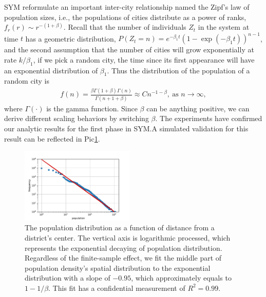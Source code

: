 \documentclass[reprint,unsortedaddress,amsmath,amssymb,aps,prl,fixfloat,showkeys]{revtex4-2}
\begin{document}
SYM reformulate an important inter-city relationship named the Zipf's law of population sizes\cite{gabaix1999zipf's}, i.e., the populations of cities distribute as a power of ranks, $f_r(r)\sim r^{-(1+\beta)}$. Recall that the number of individuals $Z_t$ in the system at time $t$ has a geometric distribution\cite{durrett1999essentials}, $P(Z_t=n)=e^{-\beta_1t}(1-\exp(- {\beta_1} t))^{n-1}$, and the second assumption that the number of cities will grow exponentially at rate $k/\beta_1$, if we pick a random city, the time since its first appearance will have an exponential distribution of $\beta_1$. Thus the distribution of the population of a random city is 
\begin{align}
	f(n)=\frac{\beta\Gamma(1+\beta)\Gamma(n)}{\Gamma(n+1+\beta)}\approx Cn^{-1-\beta}, \ \text{as } n\rightarrow\infty,
\end{align}
where $\Gamma(\cdot)$ is the gamma function. Since $\beta$ can be anything positive, we can derive different scaling behaviors by switching $\beta$. The experiments have confirmed our analytic results for the first phase in SYM.\@ A simulated validation for this result can be reflected in Pic\@\ref{fig:rankditribution}. 
\begin{figure}[t]
    \centering
    \includegraphics[width=0.48\textwidth]{pics/zipf.pdf}
    \caption{The population distribution as a function of distance from a district's center. The vertical axis is logarithmic processed, which represents the exponential decaying of population distribution. Regardless of the finite-sample effect, we fit the middle part of population density's spatial distribution to the exponential distribution with a slope of $-0.95$, which approximately equals to $1-1/\beta$. This fit has a confidential measurement of $R^2=0.99$.}
    \label{fig:rankditribution}
\end{figure}




\end{document}
